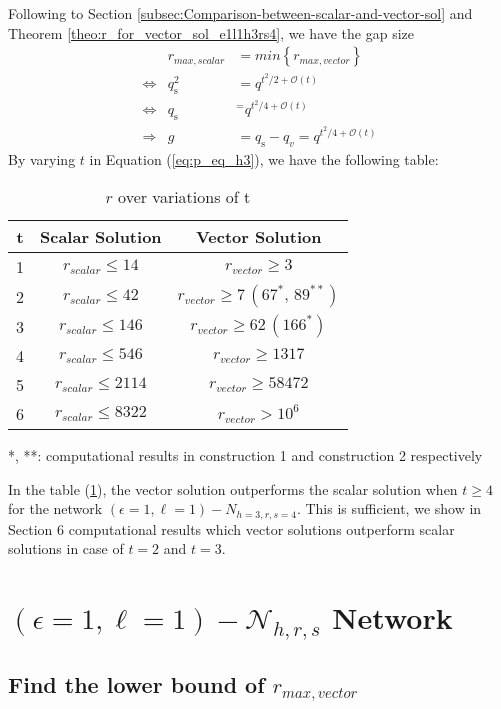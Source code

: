 Following to Section \ref{subsec:Comparison-between-scalar-and-vector-sol}
and Theorem \ref{theo:r_for_vector_sol_e1l1h3rs4}, we have the gap
size
\begin{eqnarray}
 & r_{max,scalar} & =min\left\{ r_{max,vector}\right\} \nonumber \\
\Leftrightarrow & q_{\mathrm{s}}^{2} & =q^{t^{2}/2+\mathcal{O}(t)}\nonumber \\
\Leftrightarrow & q_{\mathrm{s}} & ^{=}q^{t^{2}/4+\mathcal{O}(t)}\nonumber \\
\Rightarrow & g & =q_{\mathrm{s}}-q_{v}=q^{t^{2}/4+\mathcal{O}(t)}\label{eq:gap_e1l1h3rs4}
\end{eqnarray}
By varying $t$ in Equation (\ref{eq:p_eq_h3}), we have the following
table:
\begin{table}[H]
\caption{$r$ over variations of t\label{tab:r_over_t}}

\begin{centering}
\begin{tabular}{|c|c|c|}
\hline 
t & Scalar Solution & Vector Solution\tabularnewline
\hline 
\hline 
1 & $r_{scalar}\leq14$ & $r_{vector}\geq3$\tabularnewline
\hline 
2 & $r_{scalar}\leq42$ & $r_{vector}\geq7\,\left(67^{*},\,89^{**}\right)$\tabularnewline
\hline 
3 & $r_{scalar}\leq146$ & $r_{vector}\geq62\,\left(166^{*}\right)$ \tabularnewline
\hline 
4 & $r_{scalar}\leq546$ & $r_{vector}\geq1317$\tabularnewline
\hline 
5 & $r_{scalar}\leq2114$ & $r_{vector}\geq58472$\tabularnewline
\hline 
6 & $r_{scalar}\leq8322$ & $r_{vector}>10^{6}$\tabularnewline
\hline 
\end{tabular}
\par\end{centering}
{*}, {*}{*}: computational results in construction 1 and construction
2 respectively
\end{table}
In the table (\ref{tab:r_over_t}), the vector solution outperforms
the scalar solution when $t\geq4$ for the network $\left(\epsilon=1,\ell=1\right)-\ensuremath{N}_{h=3,r,s=4}$.
This is sufficient, we show in Section 6 computational results which
vector solutions outperform scalar solutions in case of $t=2$ and
$t=3$.

\section{$\left(\epsilon=1,\ell=1\right)-\mathcal{N}_{h,r,s}$ Network \label{sec:e1l1_nw}}

\subsection{Find the lower bound of $r_{max,vector}$}

